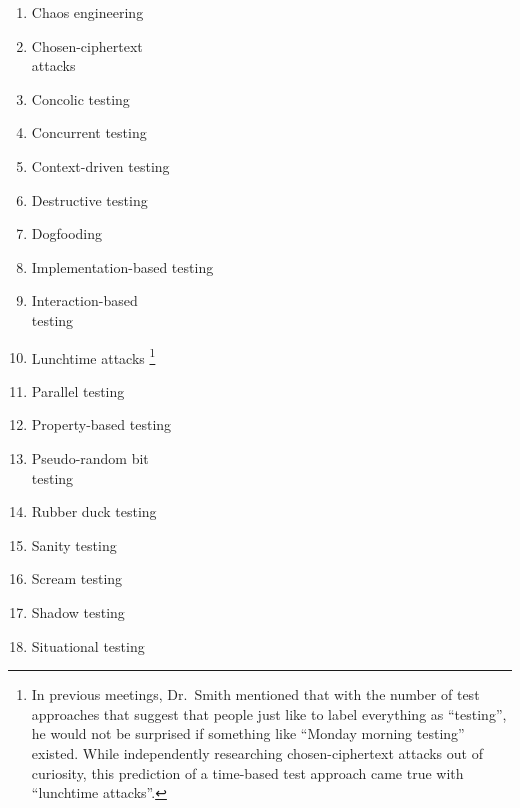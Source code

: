     \begin{minipage}{\textwidth}
        \begin{multicols}{2}
            \begin{enumerate}
                \item Chaos engineering
                \item Chosen-ciphertext \ifnotpaper\else \\ \fi attacks
                \item Concolic testing
                \item Concurrent testing
                \item Context-driven testing
                \item Destructive testing
                \item Dogfooding
                \item Implementation-based testing
                \item Interaction-based \ifnotpaper\else \\ \fi testing
                      \ifnotpaper\else\columnbreak\fi
                \item Lunchtime attacks\ifnotpaper%
                          \footnote{In previous meetings, Dr.~Smith mentioned
                              that with the number of test approaches that suggest
                              that people just like to label everything as
                              ``testing'', he would not be surprised if something
                              like ``Monday morning testing'' existed. While
                              independently researching chosen-ciphertext attacks
                              out of curiosity, this prediction of a time-based
                              test approach came true with ``lunchtime attacks''.}
                      \fi
                \item Parallel testing
                \item Property-based testing
                \item Pseudo-random bit \ifnotpaper\else \\ \fi testing
                \item Rubber duck testing
                \item Sanity testing
                \item Scream testing
                \item Shadow testing
                \item Situational testing
            \end{enumerate}
        \end{multicols}
    \end{minipage}
\fi
